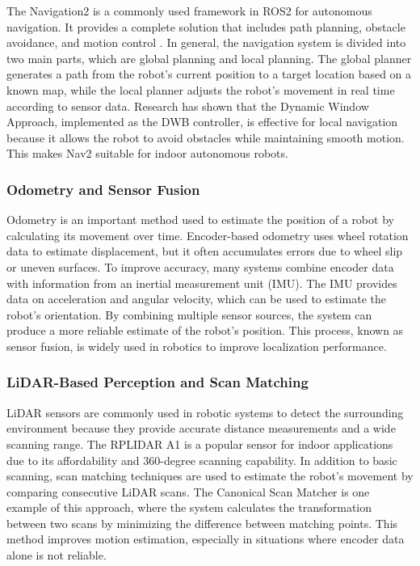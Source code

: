 The Navigation2 is a commonly used framework in ROS2 for autonomous navigation. It provides a complete solution that includes path planning, obstacle avoidance, and motion control \cite{marathon2020}. In general, the navigation system is divided into two main parts, which are global planning and local planning. The global planner generates a path from the robot’s current position to a target location based on a known map, while the local planner adjusts the robot’s movement in real time according to sensor data. Research has shown that the Dynamic Window Approach, implemented as the DWB controller, is effective for local navigation because it allows the robot to avoid obstacles while maintaining smooth motion. This makes Nav2 suitable for indoor autonomous robots.

\subsubsection{Odometry and Sensor Fusion}

Odometry is an important method used to estimate the position of a robot by calculating its movement over time. Encoder-based odometry uses wheel rotation data to estimate displacement, but it often accumulates errors due to wheel slip or uneven surfaces. To improve accuracy, many systems combine encoder data with information from an inertial measurement unit (IMU). The IMU provides data on acceleration and angular velocity, which can be used to estimate the robot’s orientation. By combining multiple sensor sources, the system can produce a more reliable estimate of the robot’s position. This process, known as sensor fusion, is widely used in robotics to improve localization performance.

\subsubsection{LiDAR-Based Perception and Scan Matching}

LiDAR sensors are commonly used in robotic systems to detect the surrounding environment because they provide accurate distance measurements and a wide scanning range. The RPLIDAR A1 is a popular sensor for indoor applications due to its affordability and 360-degree scanning capability. In addition to basic scanning, scan matching techniques are used to estimate the robot’s movement by comparing consecutive LiDAR scans. The Canonical Scan Matcher is one example of this approach, where the system calculates the transformation between two scans by minimizing the difference between matching points. This method improves motion estimation, especially in situations where encoder data alone is not reliable.

